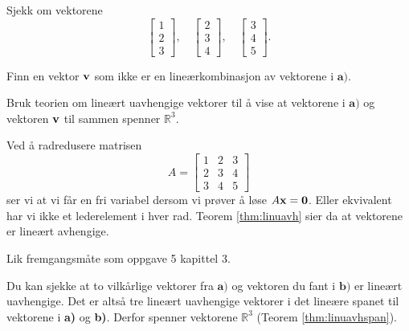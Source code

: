 

\begin{oppgave}
\begin{punkt}
Sjekk om vektorene $$
\begin{bmatrix}
1\\
2\\
3
\end{bmatrix}, \quad \begin{bmatrix}
2\\
3\\
4
\end{bmatrix}, \quad \begin{bmatrix}
3\\
4\\
5
\end{bmatrix}.
$$
\end{punkt}

\begin{punkt}
Finn en vektor $\mathbf{v}$ som ikke er en lineærkombinasjon av vektorene i $\textbf{a)}$.
\end{punkt}

\begin{punkt}
Bruk teorien om lineært uavhengige vektorer til å vise at vektorene i $\textbf{a)}$ og vektoren $\mathbf{v}$ til sammen spenner $\mathbb{R}^3$.
\end{punkt}
\end{oppgave}

\begin{losning}
\begin{punkt}
Ved å radredusere matrisen $$A=\begin{bmatrix}
1 & 2 & 3\\
2 & 3 & 4\\
3 & 4 & 5
\end{bmatrix}$$ ser vi at vi får en fri variabel dersom vi prøver å løse $A\mathbf{x}=\mathbf{0}$. Eller ekvivalent har vi ikke et lederelement i hver rad. Teorem \ref{thm:linuavh} sier da at vektorene er lineært avhengige.
\end{punkt}

\begin{punkt}
Lik fremgangsmåte som oppgave 5 kapittel 3.
\end{punkt}


\begin{punkt}
Du kan sjekke at to vilkårlige vektorer fra $\textbf{a)}$ og vektoren du fant i $\textbf{b)}$ er lineært uavhengige. Det er altså tre lineært uavhengige vektorer i det lineære spanet til vektorene i \textbf{a)} og \textbf{b)}. Derfor spenner vektorene $\mathbb{R}^3$ (Teorem \ref{thm:linuavhspan}).
\end{punkt}

\end{losning}




